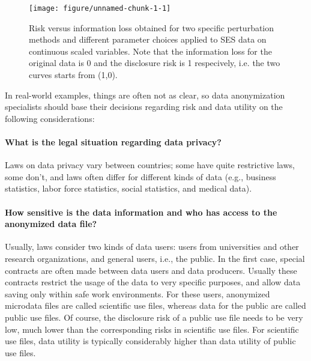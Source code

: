 \documentclass[12pt]{scrartcl}\usepackage[]{graphicx}\usepackage[]{color}
\makeatletter
\def\maxwidth{ %
  \ifdim\Gin@nat@width>\linewidth
    \linewidth
  \else
    \Gin@nat@width
  \fi
}
\newenvironment{knitrout}{}{} %
\makeatother
\begin{document}
\begin{figure}[ht!]
\begin{center}
\begin{knitrout}
\color{fgcolor}
\texttt{[image: figure/unnamed-chunk-1-1]} 

\end{knitrout}

\caption{\label{fig:rumap}Risk versus information loss obtained for two specific perturbation methods and different parameter choices applied to SES data on continuous scaled variables. Note that the information loss for the original data is 0 and the disclosure risk is 1 respecively, i.e. the two curves starts from (1,0).}
\end{center}
\vspace{-0.4cm}
\end{figure}

In real-world examples, things are often not as clear, so data anonymization specialists should base their decisions regarding risk and data utility on the following considerations:

\paragraph{What is the legal situation regarding data privacy?}
Laws on data privacy vary between countries; some have quite restrictive laws, some don't, and laws often differ for different kinds of data (e.g., business statistics, labor force statistics, social statistics, and medical data).

\paragraph{How sensitive is the data information and who has access to the anonymized data file?}
Usually, laws consider two kinds of data users: users from universities and other research organizations, and general users, i.e., the public. In the first case, special contracts are often made between data users and data producers. Usually these contracts restrict the usage of the data to very specific purposes, and allow data saving only within safe work environments. For these users, anonymized microdata files are called scientific use files, whereas data for the public are called public use files. Of course, the disclosure risk of a public use file needs to be very low, much lower than the corresponding risks in scientific use files. For scientific use files, data utility is typically considerably higher than data utility of public use files.
\end{document}
